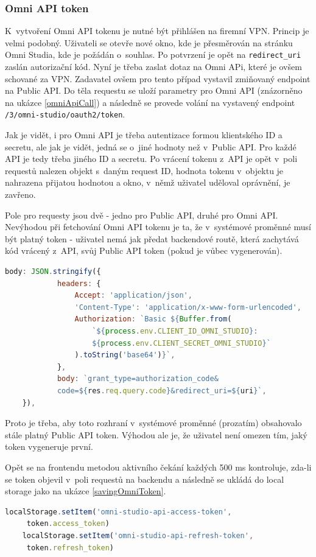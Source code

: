 \documentclass[czech, bc, kiv, he, iso690numb]{fasthesis}
\begin{document}
\subsubsection{Omni API token}
K~vytvoření Omni API tokenu je nutné být přihlášen na firemní VPN. Princip je velmi podobný. Uživateli se otevře nové okno, kde je přesměrován na stránku Omni Studia, kde je požádán
o~souhlas. Po potvrzení je opět na \texttt{redirect\_uri} zaslán autorizační kód. Nyní je třeba zaslat dotaz na Omni APi, které je ovšem schované za VPN. Zadavatel ovšem pro tento případ
vystavil zmiňovaný endpoint na Public API. Do těla requestu se uloží parametry pro Omni API (znázorněno na ukázce \ref{omniApiCall}) a následně se provede volání na vystavený endpoint
\texttt{/3/omni-studio/oauth2/token}. 

Jak je vidět, i pro Omni API je třeba autentizace formou klientského ID a secretu, ale jak je vidět, jedná se o~jiné hodnoty než v~Public API. Pro každé API
je tedy třeba jiného ID a secretu. Po vrácení tokenu z~API je opět v~poli requestů nalezen objekt s~daným request ID, hodnota tokenu v~objektu je nahrazena přijatou hodnotou a okno, v~němž
uživatel uděloval oprávnění, je zavřeno. 

Pole pro requesty jsou dvě - jedno pro Public API, druhé pro Omni API. Nevýhodou při fetchování Omni API tokenu je ta, že v~systémové proměnné musí být platný token - uživatel nemá jak předat
backendové routě, která zachytává kód vrácený z~API, svůj Public API token (pokud je vůbec vygenerován). 
\begin{lstlisting}[language=Javascript, caption={Parametry pro Omni API}, label=omniApiCall]
	body: JSON.stringify({
			headers: {
				Accept: 'application/json',
				'Content-Type': 'application/x-www-form-urlencoded',
				Authorization: `Basic ${Buffer.from(
					`${process.env.CLIENT_ID_OMNI_STUDIO}:
					${process.env.CLIENT_SECRET_OMNI_STUDIO}`
				).toString('base64')}`,
			},
			body: `grant_type=authorization_code&
			code=${res.req.query.code}&redirect_uri=${uri}`,
	}),
\end{lstlisting}
Proto je třeba, aby toto rozhraní v~systémové proměnné (prozatím) obsahovalo stále platný 
Public API token. Výhodou ale je, že uživatel není omezen tím, jaký token vygeneruje první.

Opět se na frontendu metodou aktivního čekání každých 500 ms kontroluje, zda-li se token objevil v~poli requestů na backendu a následně se ukládá do local storage jako na ukázce
\ref{savingOmniToken}.

\begin{lstlisting}[language=Javascript, caption={Ukládání Omni API tokenů do local storage}, label=savingOmniToken]
	localStorage.setItem('omni-studio-api-access-token',
	 token.access_token)
	localStorage.setItem('omni-studio-api-refresh-token',
	 token.refresh_token)
\end{lstlisting}
	
\end{document}
